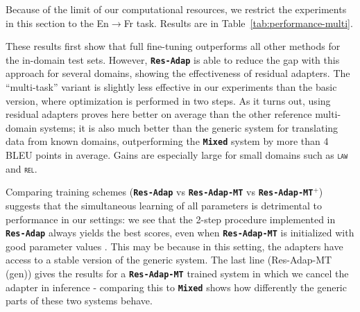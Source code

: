 \documentclass[11pt,a4paper]{article}
\newcommand{\fyFuture}[1]{\done[FY]\Todo[FY:]{\textcolor{red}{#1}}}
\newcommand{\domain}[1]{\texttt{\textsc{#1}}}
\newcommand{\system}[1]{\texttt{\textbf{#1}}}
\begin{document}
Because of the limit of our computational resources, we restrict the experiments in this section to the En$\rightarrow$Fr task. Results are in Table~\ref{tab:performance-multi}.\fyFuture{Perform experiments for de:en}\fyFuture{Restore results where residual are removed from other paper.}

These results first show that full fine-tuning outperforms all other methods for the in-domain test sets. However, \system{Res-Adap} is able to reduce the gap with this approach for several domains, showing the effectiveness of residual adapters. The ``multi-task'' variant is slightly less effective in our experiments than the basic version, where optimization is performed in two steps. As it turns out, using residual adapters proves here better on average than the other reference multi-domain systems; it is also much better than the generic system for translating data from known domains, outperforming the \system{Mixed} system by more than 4 BLEU points in average. Gains are especially large for small domains such as \domain{law} and \domain{rel}.

Comparing training schemes (\system{Res-Adap} vs \system{Res-Adap-MT} vs \system{Res-Adap-MT}$^+$) suggests that the simultaneous learning of all parameters is detrimental to performance in our settings: we see that the 2-step procedure implemented in \system{Res-Adap} always yields the best scores, even when \system{Res-Adap-MT} is initialized with good parameter values . This may be because in this setting, the adapters have access to a stable version of the generic system. The last line ({Res-Adap-MT} (gen)) gives the results for a \system{Res-Adap-MT} trained system in which we cancel the adapter in inference - comparing this to \system{Mixed} shows how differently the generic parts of these two systems behave.
\end{document}

